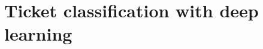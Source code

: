 \documentclass{UoYCSproject}
\begin{document}
%


    \section{Ticket classification with deep learning}
    \label{sec:estimation-with-deep-learning}
\end{document}
